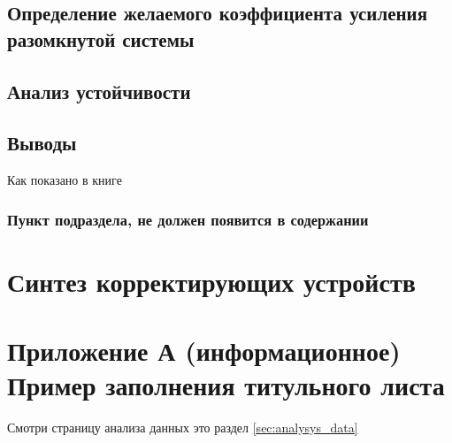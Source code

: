 \subsection{Определение желаемого коэффициента усиления разомкнутой системы} \newpage 
\label{sec:determ_factor}

\subsection{Анализ устойчивости} \newpage 
\label{sec:analysys_rob}

\subsection{Выводы} \newpage 
\label{sec:conclusion}
Как показано в книге~\cite[с.~107]{karow2001}

\subsubsection{Пункт подраздела, не должен появится в содержании} \newpage
\section{Синтез корректирующих устройств} \newpage
\section*{Приложение А (информационное)  Пример заполнения титульного листа} 
 \newpage

Смотри страницу \pageref{sec:analysys_data} анализа данных
это раздел \ref{sec:analysys_data}


